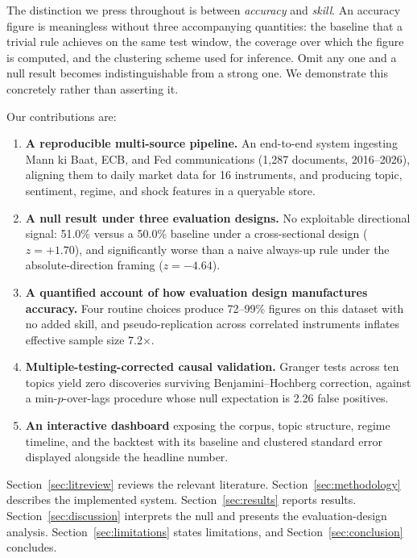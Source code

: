 \documentclass[11pt]{article}
\begin{document}
The distinction we press throughout is between \textit{accuracy} and \textit{skill}. An accuracy figure is meaningless without three accompanying quantities: the baseline that a trivial rule achieves on the same test window, the coverage over which the figure is computed, and the clustering scheme used for inference. Omit any one and a null result becomes indistinguishable from a strong one. We demonstrate this concretely rather than asserting it.

Our contributions are:
\begin{enumerate}[leftmargin=*, itemsep=0pt, topsep=4pt]
    \item \textbf{A reproducible multi-source pipeline.} An end-to-end system ingesting Mann ki Baat, ECB, and Fed communications (1{,}287 documents, 2016--2026), aligning them to daily market data for 16 instruments, and producing topic, sentiment, regime, and shock features in a queryable store.
    \item \textbf{A null result under three evaluation designs.} No exploitable directional signal: 51.0\% versus a 50.0\% baseline under a cross-sectional design ($z=+1.70$), and significantly worse than a naive always-up rule under the absolute-direction framing ($z=-4.64$).
    \item \textbf{A quantified account of how evaluation design manufactures accuracy.} Four routine choices produce 72--99\% figures on this dataset with no added skill, and pseudo-replication across correlated instruments inflates effective sample size 7.2$\times$.
    \item \textbf{Multiple-testing-corrected causal validation.} Granger tests across ten topics yield zero discoveries surviving Benjamini--Hochberg correction, against a min-$p$-over-lags procedure whose null expectation is 2.26 false positives.
    \item \textbf{An interactive dashboard} exposing the corpus, topic structure, regime timeline, and the backtest with its baseline and clustered standard error displayed alongside the headline number.
\end{enumerate}

Section~\ref{sec:litreview} reviews the relevant literature. Section~\ref{sec:methodology} describes the implemented system. Section~\ref{sec:results} reports results. Section~\ref{sec:discussion} interprets the null and presents the evaluation-design analysis. Section~\ref{sec:limitations} states limitations, and Section~\ref{sec:conclusion} concludes.
\end{document}
